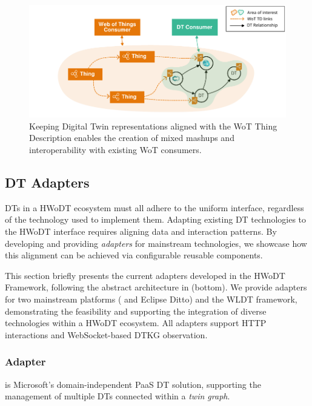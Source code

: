 \begin{figure}[ht]
  \centering
  \includegraphics[width=\columnwidth]{figures/hwodt/wot-dt-mashups.pdf}
  \caption{Keeping Digital Twin representations aligned with the \ac{WoT} Thing Description enables the creation of mixed mashups and interoperability with existing \ac{WoT} consumers.}
  \label{fig:wot-dt-mashups}
\end{figure}


\subsection{\acs{DT} Adapters}
\label{ssec:adapters}

\acp{DT} in a \ac{HWoDT} ecosystem must all adhere to the uniform interface, regardless of the technology used to implement them.
%
Adapting existing \ac{DT} technologies to the \ac{HWoDT} interface requires aligning data and interaction patterns.
%
By developing and providing \emph{adapters} for mainstream technologies, we showcase how this alignment can be achieved via configurable reusable components.

This section briefly presents the current adapters developed in the \ac{HWoDT} Framework, following the abstract architecture in  (bottom). 
%
We provide adapters for two mainstream platforms (\azureTwin{} and Eclipse Ditto) and the \acl{WLDT} framework, demonstrating the feasibility and supporting the integration of diverse technologies within a \ac{HWoDT} ecosystem.
All adapters support HTTP interactions and WebSocket-based \ac{DTKG} observation.

\subsubsection{\azureTwin{} Adapter}

\azureTwin{} is Microsoft's domain-independent \ac{PaaS} \ac{DT} solution, supporting the management of multiple \acp{DT} connected within a \emph{twin graph}.

